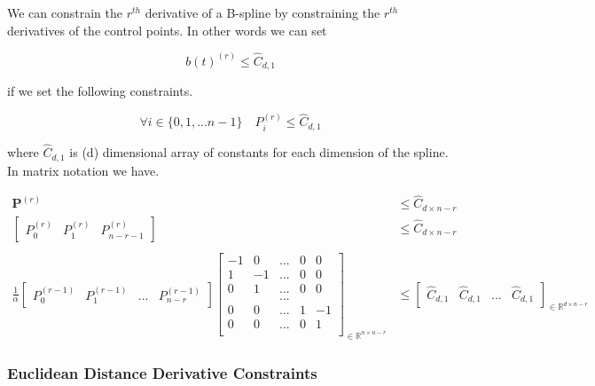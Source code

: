 \documentclass{article}
\begin{document}
We can constrain the \(r^{th}\) derivative of a B-spline by constraining the \(r^{th}\) derivatives of the control points. In other words we can set

\begin{equation}
    b(t)^{(r)} \leq \hat{C}_{d,1}
\end{equation}

if we set the following constraints.

\begin{equation}
    \forall i \in \{0 , 1 , ... n-1\} \quad
    P_i^{(r)} \leq \hat{C}_{d,1}
\end{equation}

where \(\hat{C}_{d,1}\) is (d) dimensional array of constants for each dimension of the spline. In matrix notation we have.

\begin{equation}
\begin{aligned}
    \textbf{P}^{(r)}  & \leq \hat{C}_{d \times n-r} \\
    \begin{bmatrix}
    P_0^{(r)} & P_1^{(r)} & P_{n-r-1}^{(r)}
    \end{bmatrix}  & \leq \hat{C}_{d \times n-r} \\\\
    \frac{1}{\alpha} \begin{bmatrix}
        P_0^{(r-1)} & P_1^{(r-1)} & ... & P_{n-r}^{(r-1)}
    \end{bmatrix}
    \begin{bmatrix}
    -1 &  0 & ... & 0 & 0 \\
     1 & -1 & ... & 0 & 0 \\
     0 &  1 & ... & 0  & 0  \\
       &    & ... &   &   \\
     0  &  0 & ... & 1 & -1 \\
     0 &  0 & ... & 0 & 1 \\
    \end{bmatrix} _{\in \mathbb{R}^{n \times n-r}} & \leq 
    \begin{bmatrix}
    \hat{C}_{d,1} & \hat{C}_{d,1}  & ... & \hat{C}_{d,1} 
    \end{bmatrix}_{\in \mathbb{R}^{d \times n-r}}
\end{aligned}
\end{equation}

\subsubsection{Euclidean Distance Derivative Constraints}
\end{document}
